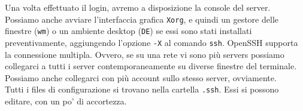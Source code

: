 \documentclass[11pt]{book}
\begin{document}
Una volta effettuato il login, avremo a disposizione la console del server. Possiamo anche avviare l'interfaccia grafica \verb*|Xorg|, e quindi un gestore delle finestre (\verb*|wm|) o un ambiente desktop (\verb*|DE|) se essi sono stati installati preventivamente, aggiungendo l'opzione \verb*|-X| al comando \verb*|ssh|. OpenSSH supporta la connessione multipla. Ovvero, se su una rete vi sono più servers possiamo collegarci a tutti i server contemporaneamente su diverse finestre del terminale. Possiamo anche collegarci con più account sullo stesso server, ovviamente. \\
Tutti i files di configurazione si trovano nella cartella \verb*|.ssh|. Essi si possono editare, con un po' di accortezza. 
\end{document}
